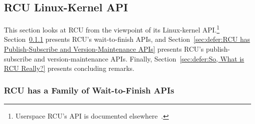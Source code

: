
\subsection{RCU Linux-Kernel API}
\label{sec:defer:RCU Linux-Kernel API}

This section looks at RCU from the viewpoint of its Linux-kernel API.\footnote{
	Userspace RCU's API is documented
	elsewhere~\cite{PaulMcKenney2013LWNURCU}.}
Section~\ref{sec:defer:RCU has a Family of Wait-to-Finish APIs}
presents RCU's wait-to-finish APIs, and
Section~\ref{sec:defer:RCU has Publish-Subscribe and Version-Maintenance APIs}
presents RCU's publish-subscribe and version-maintenance APIs.
Finally,
Section~\ref{sec:defer:So, What is RCU Really?}
presents concluding remarks.

\subsubsection{RCU has a Family of Wait-to-Finish APIs}
\label{sec:defer:RCU has a Family of Wait-to-Finish APIs}

